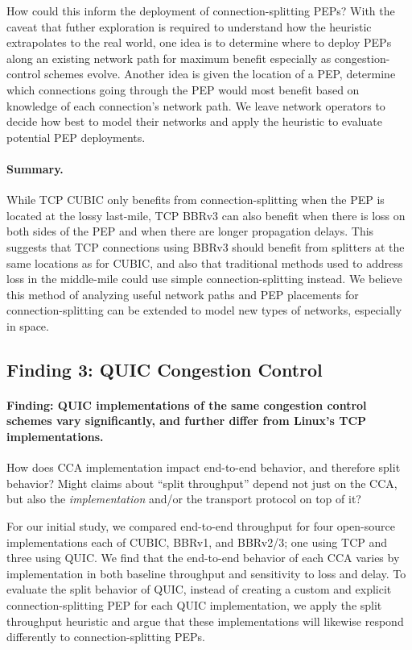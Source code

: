 How could this inform the deployment of connection-splitting PEPs?
With the caveat that futher exploration is required to understand how the
heuristic extrapolates to the real world, one idea is to
determine where to deploy PEPs along an existing network path for maximum
benefit especially as congestion-control schemes evolve.
Another idea is given the location of a PEP, determine which connections going
through the PEP would most benefit based on knowledge of each connection's
network path.
We leave network operators to decide how best to model their networks and apply
the heuristic to evaluate potential PEP deployments.

\paragraph{Summary.}
While TCP CUBIC only benefits from connection-splitting when the PEP is located
at the lossy last-mile, TCP BBRv3 can also benefit when there is loss on both
sides of the PEP and when there are longer propagation delays. This suggests
that TCP connections using BBRv3 should benefit from splitters at the same
locations as for CUBIC, and also that traditional methods used to
address loss in the middle-mile could use simple connection-splitting instead.
We believe this method of analyzing useful network paths and PEP placements for
connection-splitting can be extended to model new types of networks, especially
in space.

\subsection{Finding 3: QUIC Congestion Control}
\label{sec:splitting:results:finding3}

\paragraph{Finding: QUIC implementations of the same congestion control schemes
 vary significantly, and further differ from Linux's TCP implementations.}



How does CCA implementation impact end-to-end behavior, and therefore split
behavior? Might claims about ``split throughput'' depend not just on the CCA,
but also the \textit{implementation} and/or the transport protocol
on top of it?

For our initial study, we compared end-to-end throughput for four open-source
implementations each of CUBIC, BBRv1, and BBRv2/3; one using TCP and three
using QUIC. We find that the end-to-end behavior of each CCA varies by
implementation in both baseline throughput and sensitivity to loss and delay.
To evaluate the split behavior of QUIC, instead of creating a custom and
explicit connection-splitting PEP for each QUIC implementation, we apply the
split throughput heuristic and argue that these implementations
will likewise respond differently to connection-splitting PEPs.

